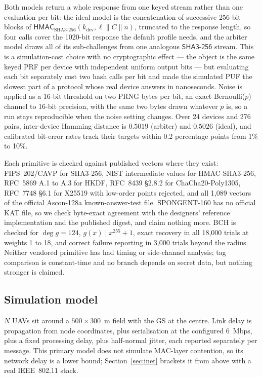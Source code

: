 \documentclass[conference]{IEEEtran}
\begin{document}
Both models return a whole response from one keyed stream rather than one
evaluation per bit: the ideal model is the concatenation of successive 256-bit
blocks of $\mathsf{HMAC}_{\text{SHA3-256}}(k_{\text{dev}}, \ell \| C \| n)$,
truncated to the response length, so four calls cover the 1020-bit response the
default profile needs, and the arbiter model draws all of its sub-challenges from
one analogous $\mathsf{SHA3\text{-}256}$ stream. This is a simulation-cost choice
with no cryptographic effect --- the object is the same keyed PRF per device with
independent uniform output bits --- but evaluating each bit separately cost two
hash calls per bit and made the simulated PUF the slowest part of a protocol
whose real device answers in nanoseconds. Noise is applied as a 16-bit threshold
on two PRNG bytes per bit, an exact Bernoulli($p$) channel to 16-bit precision,
with the same two bytes drawn whatever $p$ is, so a run stays reproducible when
the noise setting changes. Over 24 devices and 276 pairs, inter-device Hamming
distance is $0.5019$ (arbiter) and $0.5026$ (ideal), and calibrated bit-error
rates track their targets within 0.2 percentage points from 1\% to 10\%.

Each primitive is checked against published vectors where they exist:
FIPS~202/CAVP for SHA3-256, NIST intermediate values for HMAC-SHA3-256, RFC~5869
A.1 to A.3 for HKDF, RFC~8439 \S2.8.2 for ChaCha20-Poly1305, RFC~7748 \S6.1 for
X25519 with low-order points rejected, and all 1{,}089 vectors of the official
Ascon-128a known-answer-test file. SPONGENT-160 has no official KAT file, so we
check byte-exact agreement with the designers' reference implementation and the
published digest, and claim nothing more. BCH is checked for $\deg g = 124$,
$g(x) \mid x^{255}+1$, exact recovery in all 18{,}000 trials at weights 1 to 18,
and correct failure reporting in 3{,}000 trials beyond the radius. Neither
vendored primitive has had timing or side-channel analysis; tag comparison is
constant-time and no branch depends on secret data, but nothing stronger is
claimed.

\subsection{Simulation model}

$N$ UAVs sit around a $500 \times 300$~m field with the GS at the centre. Link
delay is propagation from node coordinates, plus serialisation at the configured
6~Mbps, plus a fixed processing delay, plus half-normal jitter, each reported
separately per message. This primary model does not simulate MAC-layer
contention, so its network delay is a lower bound; Section~\ref{sec:inet}
brackets it from above with a real IEEE~802.11 stack.
\end{document}

